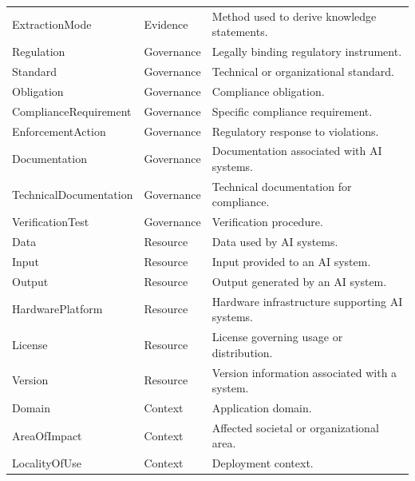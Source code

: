 \documentclass[a4paper,fleqn]{cas-dc}
\begin{document}
\begin{longtable}{>{\raggedright\arraybackslash}p{3.2cm}p{2.2cm}p{7.8cm}}
ExtractionMode & Evidence &
Method used to derive knowledge statements. \\

Regulation & Governance &
Legally binding regulatory instrument. \\

Standard & Governance &
Technical or organizational standard. \\

Obligation & Governance &
Compliance obligation. \\

Compliance\allowbreak Requirement & Governance &
Specific compliance requirement. \\

EnforcementAction & Governance &
Regulatory response to violations. \\

Documentation & Governance &
Documentation associated with AI systems. \\

Technical\allowbreak Documentation & Governance &
Technical documentation for compliance. \\

VerificationTest & Governance &
Verification procedure. \\

Data & Resource &
Data used by AI systems. \\

Input & Resource &
Input provided to an AI system. \\

Output & Resource &
Output generated by an AI system. \\

HardwarePlatform & Resource &
Hardware infrastructure supporting AI systems. \\

License & Resource &
License governing usage or distribution. \\

Version & Resource &
Version information associated with a system. \\

Domain & Context &
Application domain. \\

AreaOfImpact & Context &
Affected societal or organizational area. \\

LocalityOfUse & Context &
Deployment context. \\


\end{longtable}
\end{document}
